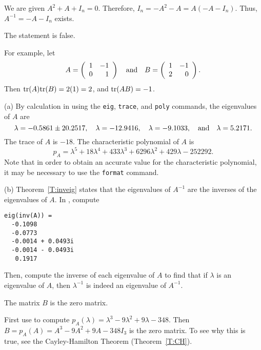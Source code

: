 We are given $A^2 + A + I_n = 0$.  Therefore, $I_n = -A^2 - A =
A(-A - I_n)$.  Thus, $A^{-1} = -A - I_n$ exists.

 \ans The statement is false.

\soln For example, let
\[
A = \left(\begin{array}{rr} 1 & -1\\ 0 &1\end{array}\right) \quad\mbox{and}\quad B = \left(\begin{array}{rr} 1 & -1\\ 2 &0\end{array}\right).
\]
Then ${\rm tr}(A){\rm tr}(B) = 2(1) = 2$, and ${\rm tr}(AB) = -1$.

(a) By calculation in \Matlab using the {\tt eig}, {\tt trace}, and
{\tt poly} commands, the eigenvalues of $A$ are 
\[
\lambda = -0.5861 \pm 20.2517, \quad
\lambda = -12.9416, \quad
\lambda = -9.1033, \quad\mbox{and}\quad
\lambda = 5.2171.
\]
The trace of $A$ is $-18$.  The characteristic polynomial of $A$ is
\[
p_A = \lambda^5 + 18\lambda^4 + 433\lambda^3 + 6296\lambda^2 +
429\lambda - 252292.
\]
Note that in order to obtain an accurate value for the characteristic
polynomial, it may be necessary to use the {\tt format} command.

(b) Theorem~\ref{T:inveig} states that the eigenvalues of $A^{-1}$ are
the inverses of the eigenvalues of $A$.  In \Matlab, compute
\begin{verbatim}
eig(inv(A)) =
  -0.1098    
  -0.0773    
  -0.0014 + 0.0493i
  -0.0014 - 0.0493i
   0.1917
\end{verbatim}
Then, compute the inverse of each eigenvalue of $A$ to find that if
$\lambda$ is an eigenvalue of $A$, then $\lambda^{-1}$ is indeed an
eigenvalue of $A^{-1}$. 

\ans The matrix $B$ is the zero matrix.

\soln First use \Matlab to compute
$p_A(\lambda) = \lambda^3 - 9\lambda^2 + 9\lambda - 348$.  Then
$B = p_A(A) = A^3 - 9A^2 + 9A - 348I_3$ is the zero matrix.  To
see why this is true, see the Cayley-Hamilton Theorem
(Theorem~\ref{T:CH}).


